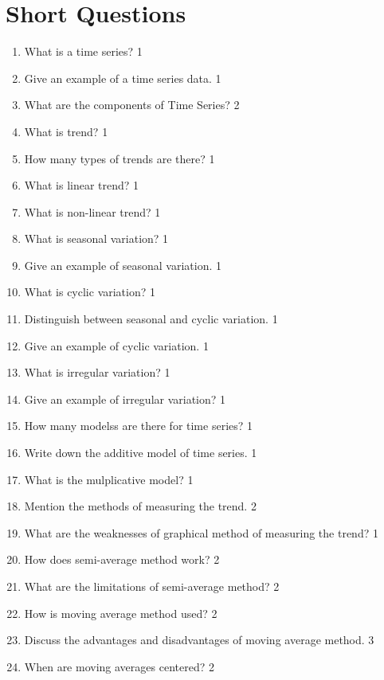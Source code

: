\documentclass[a4paper,oneside]{book}
\begin{document}
\section{Short Questions}

  \begin{enumerate}
    \item What is a time series? \hfill 1
    \item Give an example of a time series data. \hfill 1
    \item What are the components of Time Series?  \hfill 2
    \item What is trend?  \hfill 1
    \item How many types of trends are there? \hfill 1
    \item What is linear trend?  \hfill 1
    \item What is non-linear trend? \hfill 1
    \item What is seasonal variation? \hfill 1
    \item Give an example of seasonal variation. \hfill 1
    \item What is cyclic variation?  \hfill 1
    \item Distinguish between seasonal and cyclic variation. \hfill 1
    \item Give an example of cyclic variation. \hfill 1
    \item What is irregular variation? \hfill 1
    \item Give an example of irregular variation? \hfill 1
    \item How many modelss are there for time series? \hfill 1
    \item Write down the additive model of time series. \hfill 1
    \item What is the mulplicative model? \hfill 1
    \item Mention the methods of measuring the trend. \hfill 2
    \item What are the weaknesses of graphical method of measuring the trend? \hfill 1
    \item How does semi-average method work? \hfill 2
    \item What are the limitations of semi-average method? \hfill 2
    \item How is moving average method used?  \hfill 2
    \item Discuss the advantages and disadvantages of moving average method. \hfill 3
    \item When are moving averages centered? \hfill 2
    
     \end{enumerate}
\end{document}
